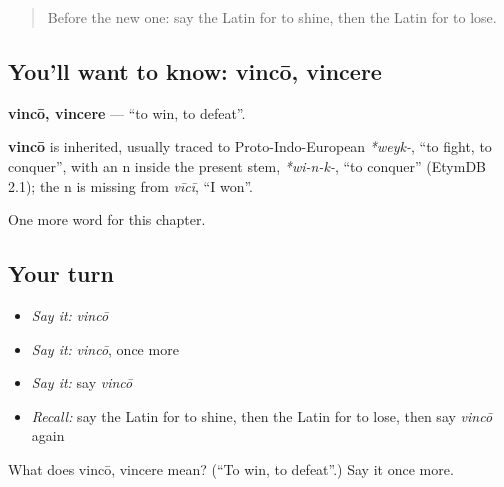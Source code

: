 \label{lesson:LA-C157-vinco}



\begin{quote}
Before the new one: say the Latin for to shine, then the Latin for to lose.
\end{quote}

\subsection*{You'll want to know: vincō, vincere}
\textbf{vincō, vincere} — \textquotedblleft{}to win, to defeat\textquotedblright{}.

\begin{cousinweb}
\textbf{vincō} is inherited, usually traced to Proto-Indo-European \emph{*weyk-}, \textquotedblleft{}to fight, to conquer\textquotedblright{}, with an n inside the present stem, \emph{*wi-n-k-}, \textquotedblleft{}to conquer\textquotedblright{} (EtymDB 2.1); the n is missing from \emph{vīcī}, \textquotedblleft{}I won\textquotedblright{}.
\end{cousinweb}

\begin{grammarlens}[title={What you've built}]
One more word for this chapter.
\end{grammarlens}

\subsection*{Your turn}
\begin{itemize}
\raggedright
  \item \emph{Say it:} \emph{vincō}
  \item \emph{Say it:} \emph{vincō}, once more
  \item \emph{Say it:} say \emph{vincō}
  \item \emph{Recall:} say the Latin for to shine, then the Latin for to lose, then say \emph{vincō} again
\end{itemize}

\begin{tcolorbox}[breakable,colback=teal!4,colframe=teal!35!black,title={Before you move on}]
What does vincō, vincere mean? (\textquotedblleft{}To win, to defeat\textquotedblright{}.) Say it once more.
\end{tcolorbox}
